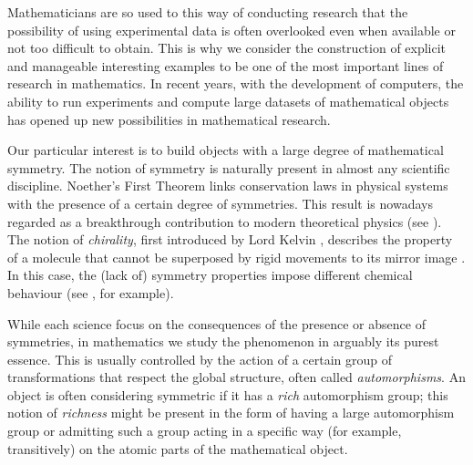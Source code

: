 \documentclass[a4paper,12pt,english]{article}
\begin{document}
Mathematicians are so used to this way of conducting research that the possibility of using experimental data is often overlooked even when available or not too difficult to obtain.
This is why we consider the construction of explicit and manageable interesting examples to be one of the most important lines of research in mathematics.
In recent years, with the development of computers, the ability to run experiments and compute large datasets of mathematical objects has opened up new possibilities in mathematical research.

Our particular interest is to build objects with a large degree of mathematical symmetry.
The notion of symmetry is naturally present in almost any scientific discipline. 
Noether's First Theorem \cite{Noether1918_InvarianteVariationsprobleme} links conservation laws in physical systems with the presence of a certain degree of symmetries. 
This result is nowadays regarded as a breakthrough contribution to modern theoretical physics (see \cite{KosmaSchwa2011_NoetherTheoremsInvariance}).
The notion of \emph{chirality}, first introduced by Lord Kelvin \cite{Kelvin1894_MolecularTacticsCrystal}, describes the property of a molecule that cannot be superposed by rigid movements to its mirror image \cite{McNauWilki1997_CompendiumChemicalTerminology}. 
In this case, the (lack of) symmetry properties impose different chemical behaviour (see \cite{JaffAltMer1964_AntipyridoxineEffectPenicillamine}, for example).

While each science focus on the consequences of the presence or absence of symmetries, in mathematics we study the phenomenon in arguably its purest essence. 
This is usually controlled by the action of a certain group of transformations that respect the global structure, often called \emph{automorphisms}. 
An object is often considering symmetric if it has a \emph{rich} automorphism group; this notion of \emph{richness} might be present in the form of having a large automorphism group or admitting such a group acting in a specific way (for example, transitively) on the atomic parts of the mathematical object. 
\end{document}
